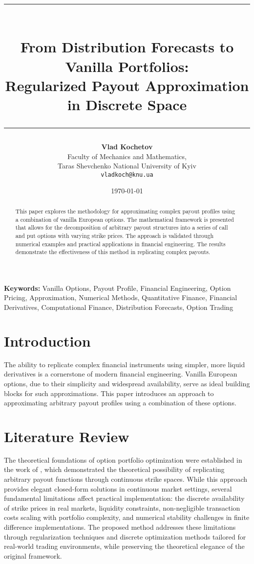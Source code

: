 \documentclass[12pt]{article}
\title{\rule{\textwidth}{4pt}\\[1em]
\textbf{From Distribution Forecasts to Vanilla Portfolios: \\[0.2cm]
Regularized Payout Approximation in Discrete Space}\\[1em]
\rule{\textwidth}{2pt}}
\author{\small \textbf{Vlad Kochetov} \\
    \small Faculty of Mechanics and Mathematics, \\
    \small Taras Shevchenko National University of Kyiv \\
    \small \texttt{vladkoch@knu.ua}
}
\date{\today}
\providecommand{\keywords}[1]{\textbf{Keywords:} #1}
\begin{document}
\thispagestyle{empty}

\maketitle

\begin{abstract}
This paper explores the methodology for approximating complex payout profiles using a
combination of vanilla European options. The mathematical framework is presented that
allows for the decomposition of arbitrary payout structures into a series of call and
put options with varying strike prices. The approach is validated through numerical
examples and practical applications in financial engineering. The results demonstrate
the effectiveness of this method in replicating complex payouts.
\end{abstract}

\newpage

\keywords{
    \small{
        Vanilla Options, 
        Payout Profile, 
        Financial Engineering, 
        Option Pricing, 
        Approximation, 
        Numerical Methods,
        Quantitative Finance,
        Financial Derivatives,
        Computational Finance,
        Distribution Forecasts,
        Option Trading
    }
}

\section{Introduction}
The ability to replicate complex financial instruments using simpler, more liquid
derivatives is a cornerstone of modern financial engineering. Vanilla European 
options, due to their simplicity and widespread availability, serve as ideal 
building blocks for such approximations. This paper introduces an approach to 
approximating arbitrary payout profiles using a combination of these options.

\section{Literature Review}
The theoretical foundations of option portfolio optimization were established in the work of 
\citep{Carr01012001}, which demonstrated the theoretical possibility of replicating 
arbitrary payout functions through continuous strike spaces. While this approach 
provides elegant closed-form solutions in continuous market settings, several fundamental 
limitations affect practical implementation: the discrete availability of strike prices 
in real markets, liquidity constraints, non-negligible transaction costs scaling with 
portfolio complexity, and numerical stability challenges in finite difference implementations. 
The proposed method addresses these limitations through regularization techniques and 
discrete optimization methods tailored for real-world trading environments, while 
preserving the theoretical elegance of the original framework.
\end{document}
